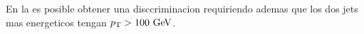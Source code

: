
En la {\SRL} es posible obtener una disccriminacion requiriendo ademas que los dos jets
mas energeticos tengan $\pt>100 \gev$.






